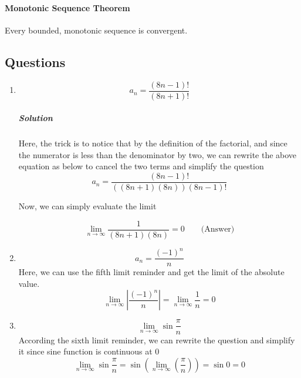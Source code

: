 \documentclass{article}
\begin{document}
\paragraph{Monotonic Sequence Theorem}
Every bounded, monotonic sequence is convergent.

\subsection{Questions}

\begin{enumerate}[1.]
\item
\[
	a_n = \frac{ (8n-1)! }{ (8n+1)! } 
\]

\subparagraph{Solution}
Here, the trick is to notice that by the definition of the factorial, and since the numerator is less than the denominator by two, we can rewrite the above equation as below to cancel the two terms and simplify the question
\[
	a_n= \frac{ (8n-1)! }{ ((8n+1)(8n))(8n-1)!  } 
\]

Now, we can simply evaluate the limit

\[
	\lim_{n \to \infty} \frac{1}{(8n+1)(8n)} = 0 \qquad \text{(Answer)}
\]
\item \[
		a_n= \frac{ (-1)^n }{ n } 
\]
Here, we can use the fifth limit reminder and get the limit of the absolute value. 
\[
	\lim_{n \to \infty} \left|  \frac{ (-1)^n }{ n }   \right| = 
		\lim_{n \to \infty} \frac{1}{n} = 0
\]

\item $$\lim_{n \to \infty} \sin{ \frac{\pi}{n} } $$
	According the sixth limit reminder, we can rewrite the question and simplify it since sine function is continuous at 0 
		\[\lim_{n \to \infty} \sin{ \frac{\pi}{n} } = 
			\sin{ \left( \lim_{n \to \infty} (\frac{\pi}{n}) \right) } = \sin{ 0 } = 0
		\]
		
\end{enumerate}




	
\end{document}
